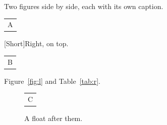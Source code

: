 \documentclass{article}
\begin{document}
Two figures side by side, each with its own caption.

\noindent\begin{minipage}{0.45\textwidth}
\centering
\begin{tabular}{c}A\end{tabular}
\label{fig:l}
\end{minipage}\hfill
\begin{minipage}{0.45\textwidth}
\captionsetup{labelsep=period}
[Short]{Right, on top.}\label{tab:r}
\centering
\begin{tabular}{c}B\end{tabular}
\end{minipage}

Figure~\ref{fig:l} and Table~\ref{tab:r}.
\begin{figure}[h]
\centering
\begin{tabular}{c}C\end{tabular}
\caption{A float after them.}\label{fig:c}
\end{figure}
\end{document}
